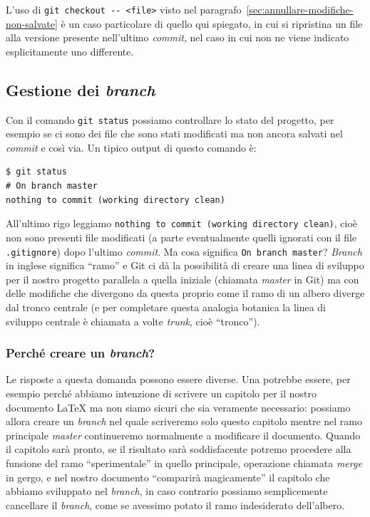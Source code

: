 \documentclass[a4paper,12pt,oneside]{article}
\begin{document}
L'uso di \lstinline|git checkout -- <file>| visto nel
paragrafo~\ref{sec:annullare-modifiche-non-salvate} è un caso particolare di
quello qui spiegato, in cui si ripristina un file alla versione presente
nell'ultimo \emph{commit}, nel caso in cui non ne viene indicato esplicitamente
uno differente.

\subsection{Gestione dei \emph{branch}}
\label{sec:branch}

Con il comando \lstinline|git status| possiamo controllare lo stato del progetto,
per esempio se ci sono dei file che sono stati modificati ma non ancora salvati
nel \emph{commit} e così via. Un tipico output di questo comando è:
\begin{lstlisting}
$ git status
# On branch master
nothing to commit (working directory clean)
\end{lstlisting}
All'ultimo rigo leggiamo \lstinline|nothing to commit (working directory clean)|,
cioè non sono presenti file modificati (a parte eventualmente quelli ignorati con
il file \lstinline|.gitignore|) dopo l'ultimo \emph{commit}. Ma cosa significa
\lstinline|On branch master|? \emph{Branch} in inglese significa ``ramo'' e
Git ci dà la possibilità di creare una linea di sviluppo per il nostro progetto
parallela a quella iniziale (chiamata \emph{master} in Git) ma con delle
modifiche che divergono da questa proprio come il ramo di un albero diverge dal
tronco centrale (e per completare questa analogia botanica la linea di sviluppo
centrale è chiamata a volte \emph{trunk}, cioè ``tronco'').

\subsubsection{Perché creare un \emph{branch}?}
Le risposte a questa domanda possono essere diverse. Una potrebbe essere, per
esempio perché abbiamo intenzione di scrivere un capitolo per il nostro documento
\LaTeX{} ma non siamo sicuri che sia veramente necessario: possiamo allora creare
un \emph{branch} nel quale scriveremo solo questo capitolo mentre nel ramo
principale \emph{master} continueremo normalmente a modificare il documento.
Quando il capitolo sarà pronto, se il risultato sarà soddisfacente potremo
procedere alla funsione del ramo ``sperimentale'' in quello principale, operazione
chiamata \emph{merge} in gergo, e nel nostro documento ``comparirà magicamente''
il capitolo che abbiamo sviluppato nel \emph{branch}, in caso contrario possiamo
semplicemente cancellare il \emph{branch}, come se avessimo potato il ramo
indesiderato dell'albero.
\end{document}
